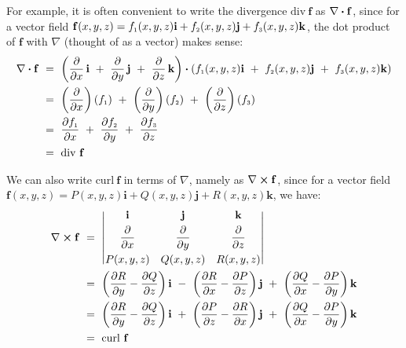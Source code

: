 For example, it is often convenient to write the divergence $\text{div}~\mathbf{f}$ as $\nabla \bm{\cdot} \mathbf{f}$,
since for a vector field $\mathbf{f}(x,y,z) =
f_{\scriptscriptstyle 1}(x,y,z)\mathbf{i} + f_{\scriptscriptstyle 2}(x,y,z) \mathbf{j} + f_{\scriptscriptstyle 3}(x,y,z) \mathbf{k}$, the dot product of
$\mathbf{f}$ with $\nabla$ (thought of as a vector) makes sense:
\begin{align*}
 \nabla \bm{\cdot} \mathbf{f} ~&=~ \left( \frac{\partial}{\partial x}\,\mathbf{i} ~+~
  \frac{\partial}{\partial y}\,\mathbf{j} ~+~ \frac{\partial}{\partial z}\,\mathbf{k} \right)  \bm{\cdot} \left( f_{\scriptscriptstyle 1}(x,y,z)
  \mathbf{i} ~+~ f_{\scriptscriptstyle 2}(x,y,z) \mathbf{j} ~+~ f_{\scriptscriptstyle 3}(x,y,z) \mathbf{k} \right)\\
   &=~ \left( \frac{\partial}{\partial x} \right) (f_{\scriptscriptstyle 1}) ~+~
    \left( \frac{\partial}{\partial y} \right) (f_{\scriptscriptstyle 2}) ~+~
    \left( \frac{\partial}{\partial z} \right) (f_{\scriptscriptstyle 3})\\
   &=~ \frac{\partial f_{\scriptscriptstyle 1}}{\partial x} ~+~ \frac{\partial f_{\scriptscriptstyle 2}}{\partial y} ~+~
  \frac{\partial f_{\scriptscriptstyle 3}}{\partial z}\\
   &=~ \text{div}~\mathbf{f}
\end{align*}

We can also write $\text{curl}~\mathbf{f}$ in terms of $\nabla$, namely as $\nabla \bm{\times} \mathbf{f}$, since
for a vector field $\mathbf{f}(x,y,z) = P(x,y,z)\mathbf{i} + Q(x,y,z)\mathbf{j} + R(x,y,z)\mathbf{k}$, we have:
\begin{align*}
 \Crossprod{\nabla}{\mathbf{f}} ~&=~
 \begin{vmatrix}
  \mathbf{i} & \mathbf{j} & \mathbf{k} \smallskip\\ \dfrac{\partial}{\partial x} & \dfrac{\partial}{\partial y} &
   \dfrac{\partial}{\partial z} \smallskip\\
  P(x,y,z) & Q(x,y,z) & R(x,y,z)
 \end{vmatrix}\\
 &=~ \left( \frac{\partial R}{\partial y} - \frac{\partial Q}{\partial z} \right) \mathbf{i} ~-~
    \left( \frac{\partial R}{\partial x} - \frac{\partial P}{\partial z} \right) \mathbf{j} ~+~
    \left( \frac{\partial Q}{\partial x} - \frac{\partial P}{\partial y} \right) \mathbf{k}\\
 &=~ \left( \frac{\partial R}{\partial y} - \frac{\partial Q}{\partial z} \right) \mathbf{i} ~+~
    \left( \frac{\partial P}{\partial z} - \frac{\partial R}{\partial x} \right) \mathbf{j} ~+~
    \left( \frac{\partial Q}{\partial x} - \frac{\partial P}{\partial y} \right) \mathbf{k}\\
 &=~ \text{curl}~\mathbf{f}
\end{align*}

